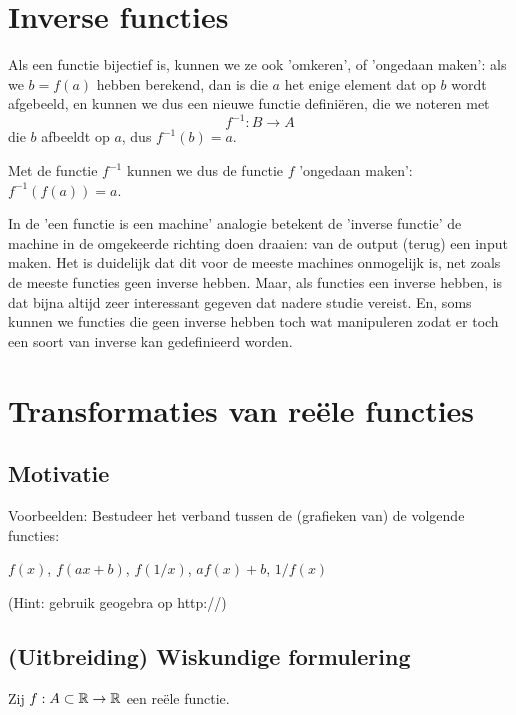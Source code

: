 \documentclass{ximera}
\begin{document}
\section{Inverse functies}

Als een functie bijectief is, kunnen we ze ook 'omkeren', of 'ongedaan maken': als we $b=f(a)$ hebben berekend, dan is die $a$ het enige element dat op $b$ wordt afgebeeld, en kunnen we dus een nieuwe functie definiëren, die we noteren met 
$$f^{-1}: B \rightarrow A$$ 
die $b$ afbeeldt op $a$, dus $f^{-1}(b) = a$.

Met de functie $f^{-1}$ kunnen we dus de functie $f$ 'ongedaan maken': $f^{-1}(f(a)) = a$.

In de 'een functie is een machine' analogie betekent de 'inverse functie' de machine in de omgekeerde richting doen draaien: van de output (terug) een input maken. Het is duidelijk dat dit voor de meeste machines onmogelijk is, net zoals de meeste functies geen inverse hebben. Maar, als functies een inverse hebben, is dat bijna altijd zeer interessant gegeven dat nadere studie vereist. En, soms kunnen we functies die geen inverse hebben toch wat manipuleren zodat er toch een soort van inverse kan gedefinieerd worden.


\section{Transformaties van reële functies}

\subsection{Motivatie}

Voorbeelden: Bestudeer het verband tussen de (grafieken van) de volgende functies: 

$f(x)$, $f(ax+b)$, $f(1/x)$, $af(x)+b$, $1/f(x)$


(Hint: gebruik geogebra op http://)

\subsection{(Uitbreiding) Wiskundige formulering}
Zij $f:A\subset\mathbb{R}\to \mathbb{R}$ een reële functie.
\end{document}
